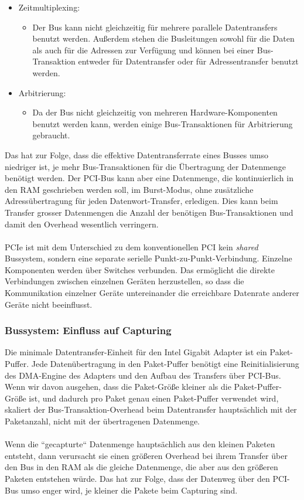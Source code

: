 {\begin{itemize}
	\item Zeitmultiplexing: 
		\begin{itemize} 
			\item Der Bus kann nicht gleichzeitig für mehrere parallele
				Datentransfers benutzt werden. Außerdem stehen die Busleitungen
				sowohl für die Daten als auch für die Adressen zur Verfügung
				und können bei einer Bus-Transaktion entweder für Datentransfer
				oder für Adressentransfer benutzt werden.
		\end{itemize}
	\item Arbitrierung: 
		\begin{itemize} 
			\item Da der Bus nicht gleichzeitig von mehreren
				Hardware-Komponenten benutzt werden kann, werden einige
				Bus-Transaktionen für Arbitrierung gebraucht. 
		\end{itemize} 
\end{itemize}
Das hat zur Folge, dass die effektive Datentransferrate eines Busses umso niedriger ist,
je mehr Bus-Transaktionen für die Übertragung der Datenmenge benötigt werden.
Der PCI-Bus kann aber eine Datenmenge, die kontinuierlich in den RAM geschrieben werden soll, im 
Burst-Modus, ohne zusätzliche  Adressübertragung für jeden Datenwort-Transfer,
erledigen. Dies kann beim Transfer grosser Datenmengen die Anzahl der benötigen
Bus-Transaktionen und damit den Overhead wesentlich verringern.\\\\
%
PCIe ist mit dem Unterschied zu dem konventionellen PCI kein \emph{shared}
Bussystem, sondern eine separate serielle Punkt-zu-Punkt-Verbindung. Einzelne
Komponenten werden über Switches verbunden. Das ermöglicht die direkte
Verbindungen zwischen einzelnen Geräten herzustellen, so dass die
Kommunikation einzelner Geräte untereinander die erreichbare Datenrate anderer
Geräte nicht beeinflusst.

\subsubsection*{Bussystem: Einfluss auf Capturing}\label{sec:bus_einfl_auf_cap}
Die minimale Datentransfer-Einheit für den Intel Gigabit Adapter ist ein
Paket-Puffer. Jede
Datenübertragung in den Paket-Puffer benötigt eine Reinitialisierung des
DMA-Engine des Adapters und den Aufbau des Transfers über PCI-Bus.  Wenn wir davon
ausgehen, dass die Paket-Größe kleiner als die Paket-Puffer-Größe ist, und dadurch
pro Paket genau einen Paket-Puffer verwendet wird, skaliert der
Bus-Transaktion-Overhead beim Datentransfer hauptsächlich mit der Paketanzahl,
nicht mit der übertragenen Datenmenge.\\\\
%
Wenn die ``gecapturte`` Datenmenge hauptsächlich aus den kleinen Paketen
entsteht, dann verursacht sie einen größeren Overhead bei ihrem Transfer über
den Bus in den RAM als die gleiche Datenmenge, die aber aus den größeren
Paketen entstehen würde. Das hat zur Folge, dass der Datenweg über den PCI-Bus
umso enger wird, je kleiner die Pakete beim Capturing sind.
 
}
